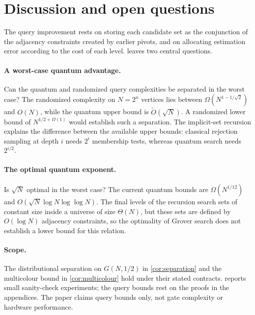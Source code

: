 \section{Discussion and open questions}
\label{sec:scope}

The query improvement rests on storing each candidate set as the
conjunction of the adjacency constraints created by earlier pivots, and on
allocating estimation error according to the cost of each level.
 leaves two central questions.

\paragraph{A worst-case quantum advantage.}
Can the quantum and randomized query complexities be separated in the worst
case?  The randomized complexity on $N=2^n$ vertices lies between
$\Omega(N^{1-1/\sqrt2})$ and $O(N)$, while the quantum upper bound is
$\widetilde O(\sqrt N)$.  A randomized lower bound of
$N^{1/2+\Omega(1)}$ would establish such a separation.  The implicit-set
recursion explains the difference between the available upper bounds:
classical rejection sampling at depth $i$ needs $2^i$ membership tests,
whereas quantum search needs $2^{i/2}$.

\paragraph{The optimal quantum exponent.}
Is $\sqrt N$ optimal in the worst case?  The current quantum bounds are
$\Omega(N^{1/12})$ and $O(\sqrt N\log N\log\log N)$.  The final levels of
the recursion search sets of constant size inside a universe of size
$\Theta(N)$, but these sets are defined by $O(\log N)$ adjacency
constraints, so the optimality of Grover search does not establish a lower
bound for this relation.

\paragraph{Scope.}
The distributional separation on $G(N,1/2)$ in \cref{cor:separation} and
the multicolour bound in \cref{cor:multicolour} hold under their stated
contracts.   reports small sanity-check experiments;
the query bounds rest on the proofs in the appendices.  The paper claims
query bounds only, not gate complexity or hardware performance.
